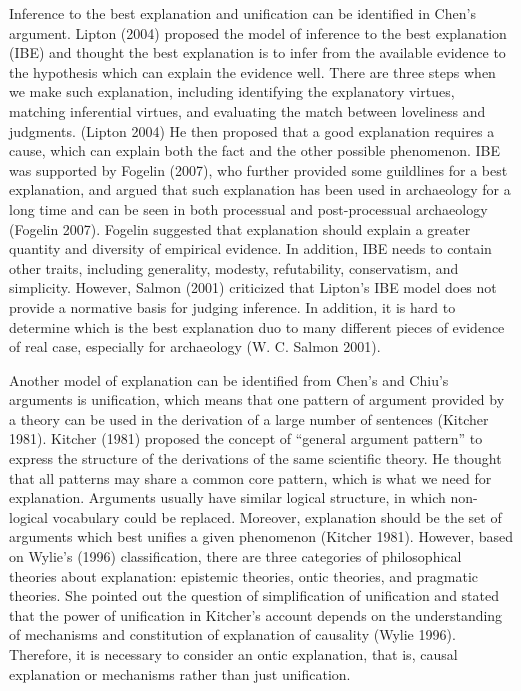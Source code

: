 \documentclass[10pt]{article}
\begin{document}
Inference to the best explanation and unification can be identified in
Chen's argument. Lipton (2004) proposed the model of inference to the
best explanation (IBE) and thought the best explanation is to infer from
the available evidence to the hypothesis which can explain the evidence
well. There are three steps when we make such explanation, including
identifying the explanatory virtues, matching inferential virtues, and
evaluating the match between loveliness and judgments. (Lipton 2004) He
then proposed that a good explanation requires a cause, which can
explain both the fact and the other possible phenomenon. IBE was
supported by Fogelin (2007), who further provided some guildlines for a
best explanation, and argued that such explanation has been used in
archaeology for a long time and can be seen in both processual and
post-processual archaeology (Fogelin 2007). Fogelin suggested that
explanation should explain a greater quantity and diversity of empirical
evidence. In addition, IBE needs to contain other traits, including
generality, modesty, refutability, conservatism, and simplicity.
However, Salmon (2001) criticized that Lipton's IBE model does not
provide a normative basis for judging inference. In addition, it is hard
to determine which is the best explanation duo to many different pieces
of evidence of real case, especially for archaeology (W. C. Salmon
2001).

Another model of explanation can be identified from Chen's and Chiu's
arguments is unification, which means that one pattern of argument
provided by a theory can be used in the derivation of a large number of
sentences (Kitcher 1981). Kitcher (1981) proposed the concept of
``general argument pattern'' to express the structure of the derivations
of the same scientific theory. He thought that all patterns may share a
common core pattern, which is what we need for explanation. Arguments
usually have similar logical structure, in which non-logical vocabulary
could be replaced. Moreover, explanation should be the set of arguments
which best unifies a given phenomenon (Kitcher 1981). However, based on
Wylie's (1996) classification, there are three categories of
philosophical theories about explanation: epistemic theories, ontic
theories, and pragmatic theories. She pointed out the question of
simplification of unification and stated that the power of unification
in Kitcher's account depends on the understanding of mechanisms and
constitution of explanation of causality (Wylie 1996). Therefore, it is
necessary to consider an ontic explanation, that is, causal explanation
or mechanisms rather than just unification.
\end{document}
